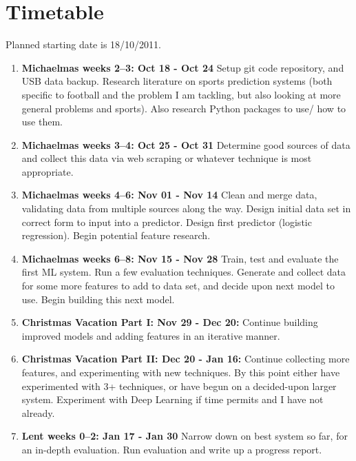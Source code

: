 \documentclass[12pt,a4paper,twoside]{article}
\begin{document}
\section*{Timetable}

Planned starting date is 18/10/2011.

\begin{enumerate}

\item \textbf{Michaelmas weeks 2--3: Oct 18 - Oct 24} Setup git code repository, and USB data backup. Research literature on sports prediction systems (both specific to football and the problem I am tackling, but also looking at more general problems and sports). Also research Python packages to use/ how to use them. 

\item \textbf{Michaelmas weeks 3--4: Oct 25 - Oct 31} Determine good sources of data and collect this data via web scraping or whatever technique is most appropriate. 

\item \textbf{Michaelmas weeks 4--6: Nov 01 - Nov 14} Clean and merge data, validating data from multiple sources along the way. Design initial data set in correct form to input into a predictor. Design first predictor (logistic regression). Begin potential feature research.

\item \textbf{Michaelmas weeks 6--8: Nov 15 - Nov 28} Train, test and evaluate the first ML system. Run a few evaluation techniques. Generate and collect data for some more features to add to data set, and decide upon next model to use. Begin building this next model.

\item \textbf{Christmas Vacation Part I: Nov 29 - Dec 20:} Continue building improved models and adding features in an iterative manner.

\item \textbf{Christmas Vacation Part II: Dec 20 - Jan 16:} Continue collecting more features, and experimenting with new techniques. By this point either have experimented with 3+ techniques, or have begun on a decided-upon larger system. Experiment with Deep Learning if time permits and I have not already.

\item \textbf{Lent weeks 0--2: Jan 17 - Jan 30} Narrow down on best system so far, for an in-depth evaluation. Run evaluation and write up a progress report.


\end{enumerate}
\end{document}
